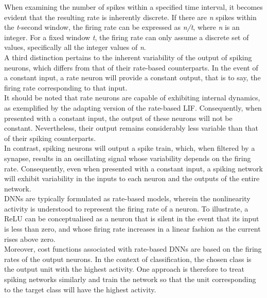 \noindent When examining the number of spikes within a specified time interval, it becomes evident that the resulting rate is inherently discrete. If there are \textit{n} spikes within the \textit{t}-second window, the firing rate can be expressed as \textit{n/t}, where \textit{n} is an integer. For a fixed window \textit{t}, the firing rate can only assume a discrete set of values, specifically all the integer values of \textit{n}. \\

\noindent A third distinction pertains to the inherent variability of the output of spiking neurons, which differs from that of their rate-based counterparts. In the event of a constant input, a rate neuron will provide a constant output, that is to say, the firing rate corresponding to that input. \\

\noindent It should be noted that rate neurons are capable of exhibiting internal dynamics, as exemplified by the adapting version of the rate-based LIF. Consequently, when presented with a constant input, the output of these neurons will not be constant. Nevertheless, their output remains considerably less variable than that of their spiking counterparts. \\

\noindent In contrast, spiking neurons will output a spike train, which, when filtered by a synapse, results in an oscillating signal whose variability depends on the firing rate. Consequently, even when presented with a constant input, a spiking network will exhibit variability in the inputs to each neuron and the outputs of the entire network. \\

\noindent DNNs are typically formulated as rate-based models, wherein the nonlinearity activity is understood to represent the firing rate of a neuron. To illustrate, a ReLU can be conceptualised as a neuron that is silent in the event that its input is less than zero, and whose firing rate increases in a linear fashion as the current rises above zero. \\

\noindent Moreover, cost functions associated with rate-based DNNs are based on the firing rates of the output neurons. In the context of classification, the chosen class is the output unit with the highest activity. One approach is therefore to treat spiking networks similarly and train the network so that the unit corresponding to the target class will have the highest activity. \\

